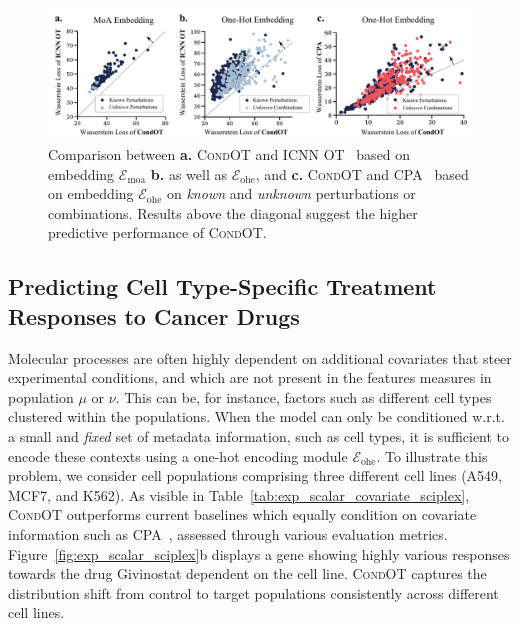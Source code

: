 \begin{figure}[t]
    \includegraphics[width=\textwidth]{figures/fig_action_comb_comparison_scatter.pdf}
    \caption{Comparison between \textbf{a.} \textsc{CondOT} and \textsc{ICNN OT}~\citep{makkuva2020optimal} based on embedding $\mathcal{E}_\text{moa}$ \textbf{b.} as well as $\mathcal{E}_\text{ohe}$, and \textbf{c.} \textsc{CondOT} and \textsc{CPA}~\citep{lotfollahi2021compositional} based on embedding $\mathcal{E}_\text{ohe}$ on \emph{known} and \emph{unknown} perturbations or combinations. Results above the diagonal suggest the higher predictive performance of \textsc{CondOT}.}
    \label{fig:exp_action_norman_scatter}
\end{figure}


\subsection{Predicting Cell Type-Specific Treatment Responses to Cancer Drugs} \label{sec:eval_covariate}

 Molecular processes are often highly dependent on additional covariates that steer experimental conditions, and which are not present in the features measures in population $\mu$ or $\nu$.
This can be, for instance, factors such as different cell types clustered within the populations.
When the model can only be conditioned w.r.t. a small and \textit{fixed} set of metadata information, such as cell types, it is sufficient to encode these contexts using a one-hot encoding module $\mathcal{E}_\text{ohe}$.
To illustrate this problem, we consider cell populations comprising three different cell lines (A549, MCF7, and K562). As visible in Table~\ref{tab:exp_scalar_covariate_sciplex}, \textsc{CondOT} outperforms current baselines which equally condition on covariate information such as \textsc{CPA}~\citep{lotfollahi2021compositional}, assessed through various evaluation metrics.
Figure~\ref{fig:exp_scalar_sciplex}b displays a gene showing highly various responses towards the drug Givinostat dependent on the cell line. \textsc{CondOT} captures the distribution shift from control to target populations consistently across different cell lines.

